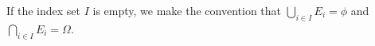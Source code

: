 \documentclass[preview]{standalone}
\begin{document}
\begin{center}
If the index set $I$ is empty, we make the convention that $\bigcup_{i \in I} E_i = \phi$ and $\bigcap_{i \in I} E_i = \Omega$.
\end{center}
\end{document}
